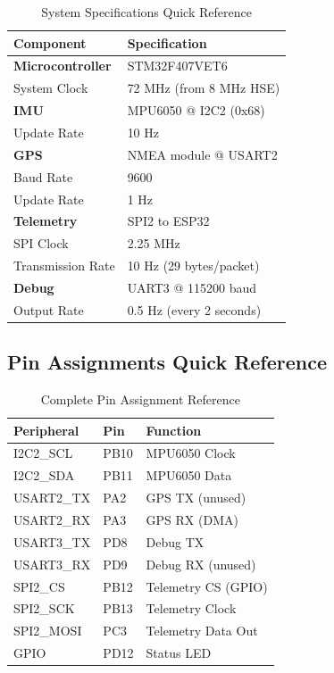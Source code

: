 \documentclass[11pt,a4paper]{article}
\begin{document}
\begin{table}[H]
\centering
\begin{tabular}{@{}ll@{}}
\toprule
\textbf{Component} & \textbf{Specification} \\
\midrule
\textbf{Microcontroller} & STM32F407VET6 \\
System Clock & 72 MHz (from 8 MHz HSE) \\
\textbf{IMU} & MPU6050 @ I2C2 (0x68) \\
Update Rate & 10 Hz \\
\textbf{GPS} & NMEA module @ USART2 \\
Baud Rate & 9600 \\
Update Rate & 1 Hz \\
\textbf{Telemetry} & SPI2 to ESP32 \\
SPI Clock & 2.25 MHz \\
Transmission Rate & 10 Hz (29 bytes/packet) \\
\textbf{Debug} & UART3 @ 115200 baud \\
Output Rate & 0.5 Hz (every 2 seconds) \\
\bottomrule
\end{tabular}
\caption{System Specifications Quick Reference}
\end{table}

\subsection{Pin Assignments Quick Reference}

\begin{table}[H]
\centering
\begin{tabular}{@{}lll@{}}
\toprule
\textbf{Peripheral} & \textbf{Pin} & \textbf{Function} \\
\midrule
I2C2\_SCL & PB10 & MPU6050 Clock \\
I2C2\_SDA & PB11 & MPU6050 Data \\
USART2\_TX & PA2 & GPS TX (unused) \\
USART2\_RX & PA3 & GPS RX (DMA) \\
USART3\_TX & PD8 & Debug TX \\
USART3\_RX & PD9 & Debug RX (unused) \\
SPI2\_CS & PB12 & Telemetry CS (GPIO) \\
SPI2\_SCK & PB13 & Telemetry Clock \\
SPI2\_MOSI & PC3 & Telemetry Data Out \\
GPIO & PD12 & Status LED \\
\bottomrule
\end{tabular}
\caption{Complete Pin Assignment Reference}
\end{table}
\end{document}
